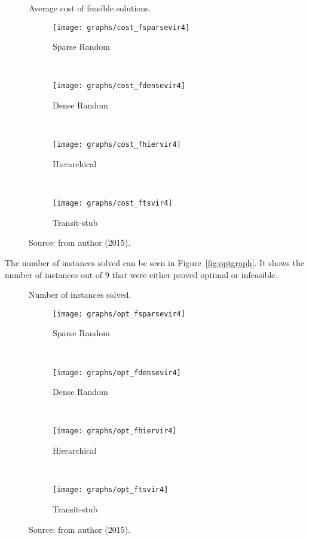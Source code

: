 \begin{figure*}
        \centering
        \caption{Average cost of feasible solutions.}\label{fig:costgraph}
        \begin{subfigure}[b]{0.480\textwidth}
                \caption{Sparse Random}
                \texttt{[image: graphs/cost\_fsparsevir4]}
                \label{fig:s12}
        \end{subfigure}
        ~
        \begin{subfigure}[b]{0.48\textwidth}
                \caption{Dense Random}
                \texttt{[image: graphs/cost\_fdensevir4]}
                \label{fig:d12}
        \end{subfigure}
        \\ 
        \begin{subfigure}[b]{0.48\textwidth}
                \caption{Hierarchical}
                \texttt{[image: graphs/cost\_fhiervir4]}
                \label{fig:h12}
        \end{subfigure}
        ~
        \begin{subfigure}[b]{0.48\textwidth}
                \caption{Transit-stub}
                \texttt{[image: graphs/cost\_ftsvir4]}
                \label{fig:t12}
        \end{subfigure}
\caption*{Source: from author (2015).}\end{figure*}

The number of instances solved can be seen in Figure~\ref{fig:optgraph}. It shows the number of instances out of 9 that were either proved optimal or infeasible. 

\begin{figure*}
        \centering
        \caption{Number of instances solved.}\label{fig:optgraph}
        \begin{subfigure}[b]{0.480\textwidth}
                \caption{Sparse Random}
                \texttt{[image: graphs/opt\_fsparsevir4]}
                \label{fig:s21}
        \end{subfigure}
        ~
        \begin{subfigure}[b]{0.48\textwidth}
                \caption{Dense Random}
                \texttt{[image: graphs/opt\_fdensevir4]}
                \label{fig:d21}
        \end{subfigure}
        \\
        \begin{subfigure}[b]{0.48\textwidth}
                \caption{Hierarchical}
                \texttt{[image: graphs/opt\_fhiervir4]}
                \label{fig:h21}
        \end{subfigure}
        ~ 
        \begin{subfigure}[b]{0.48\textwidth}
                \caption{Transit-stub}
                \texttt{[image: graphs/opt\_ftsvir4]}
                \label{fig:t21}
        \end{subfigure}
\caption*{Source: from author (2015).}\end{figure*}


